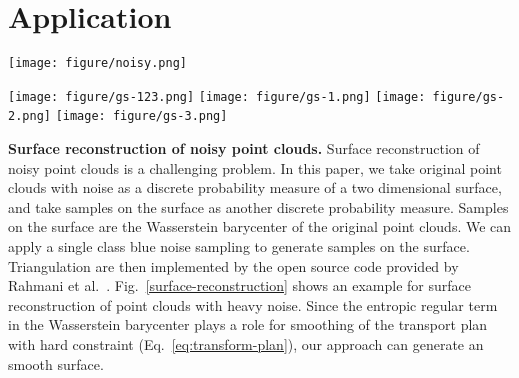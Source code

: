 \section{Application}

\begin{figure*}[htb]
  \centering

  \texttt{[image: figure/noisy.png]}
  \caption{Surface reconstruction of noisy point clouds.
  (a) is original point clouds with $8856$ points.
  (c) is mesh reconstruction result on $3946$ sampling points.
  (b) is rendering result with point clouds (a) and mesh model (c).
  (d) is the close-up view of (c) at the square mark.
   }\label{surface-reconstruction}
\end{figure*}

\begin{figure*}[htb]
  \centering
   \begin{minipage}{1\textwidth}
  \texttt{[image: figure/gs-123.png]}
  \texttt{[image: figure/gs-1.png]}
  \texttt{[image: figure/gs-2.png]}
  \texttt{[image: figure/gs-3.png]}
  \end{minipage}
  \caption{Object placement on a complex geometry model.
  The number of samples of each class is $200$, $1000$ and $1000$.}\label{gs-sampling}
\end{figure*}


\textbf{Surface reconstruction of noisy point clouds.}
Surface reconstruction of noisy point clouds is a challenging problem.
In this paper,
we take original point clouds with noise as a discrete probability measure of a two dimensional surface,
and take samples on the surface as another discrete probability measure.
Samples on the surface are the Wasserstein barycenter of the original point clouds.
We can apply a single class blue noise sampling to generate samples on the surface.
Triangulation are then implemented by the open source code provided by Rahmani et al.~\cite{rahmani:2014:hopc}.
Fig.~\ref{surface-reconstruction} shows an example for surface reconstruction of point clouds with heavy noise.
Since the entropic regular term in the Wasserstein barycenter plays a role for smoothing of the transport plan with hard constraint (Eq.~\ref{eq:transform-plan}),
our approach can generate an smooth surface.

